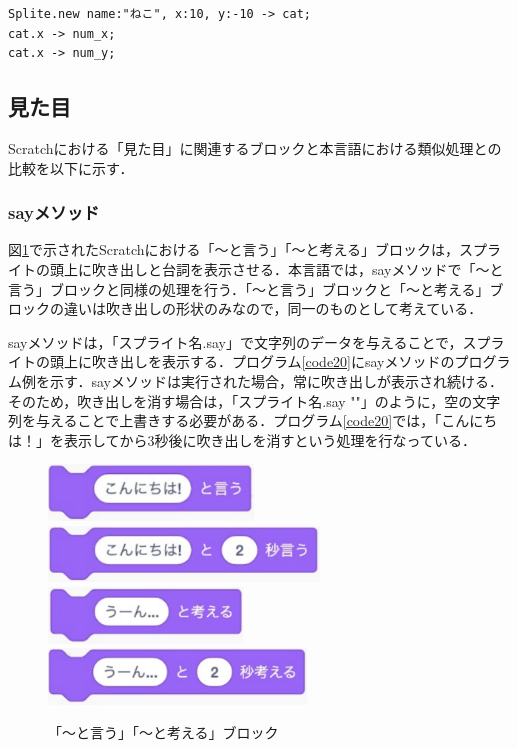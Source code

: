 \documentclass[10pt,a4j]{ltjsarticle}
\begin{document}
\begin{lstlisting}[caption=xメソッドとyメソッドのプログラム例, label=code19]
Splite.new name:"ねこ", x:10, y:-10 -> cat;
cat.x -> num_x;
cat.x -> num_y;
\end{lstlisting}
\subsection{見た目}
Scratchにおける「見た目」に関連するブロックと本言語における類似処理との比較を以下に示す．

\subsubsection{sayメソッド}
図\ref{fig:say}で示されたScratchにおける「〜と言う」「〜と考える」ブロックは，スプライトの頭上に吹き出しと台詞を表示させる．本言語では，sayメソッドで「〜と言う」ブロックと同様の処理を行う．「〜と言う」ブロックと「〜と考える」ブロックの違いは吹き出しの形状のみなので，同一のものとして考えている．

sayメソッドは，「スプライト名.say」で文字列のデータを与えることで，スプライトの頭上に吹き出しを表示する．プログラム\ref{code20}にsayメソッドのプログラム例を示す．sayメソッドは実行された場合，常に吹き出しが表示され続ける．そのため，吹き出しを消す場合は，「スプライト名.say ""」のように，空の文字列を与えることで上書きする必要がある．プログラム\ref{code20}では，「こんにちは！」を表示してから3秒後に吹き出しを消すという処理を行なっている．

\begin{figure}[H]
  \centering
  \includegraphics[height=15mm]{images/say.pdf} \\
  \includegraphics[height=15mm]{images/say_time.pdf} \\
  \includegraphics[height=15mm]{images/think.pdf} \\
  \includegraphics[height=15mm]{images/think_time.pdf} 
  \caption{「〜と言う」「〜と考える」ブロック}
  \label{fig:say}
\end{figure}
\end{document}

